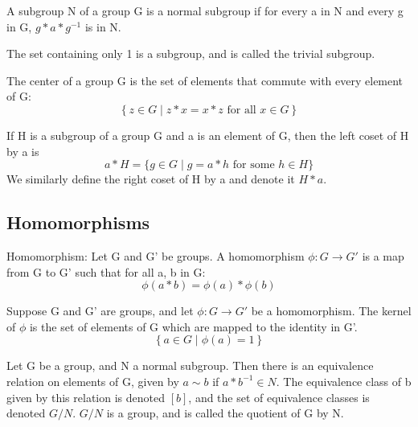 \documentclass[runningheads,a4paper]{llncs}
\renewcommand{\-}{\setminus}
\begin{document}
\begin{definition}[Normal]
A subgroup N of a group G is a normal subgroup if for every a in N and every g in G, $g * a * g^{-1}$ is in N.
\end{definition}

\begin{definition} The set containing only 1 is a subgroup, and is called the trivial subgroup.
\end{definition}

\begin{definition}[Center]
The center of a group G is the set of elements that commute with every element of G:
\[
\left\{ z \in G \mid z*x = x*z \text{ for all } x \in G \right\}
\]
\end{definition}

\begin{definition}
If H is a subgroup of a group G and a is an element of G, then the left coset of H by a is 
\[
a * H = \{ g \in G \mid g = a * h \text{ for some } h \in H \}
\]
We similarly define the right coset of H by a and denote it $H * a$.
\end{definition}

\subsection{Homomorphisms}

\begin{definition}[Homomorphism]
Homomorphism: Let G and G' be groups. A homomorphism $\phi : G \to G'$ is a map from G to G' such that for all a, b in G:
\[
\phi (a * b) = \phi(a) * \phi(b)
\]
\end{definition}

\begin{definition}[Kernel]
Suppose G and G' are groups, and let $\phi : G \to G'$ be a homomorphism. The kernel of $\phi$ is the set of elements of G which are mapped to the identity in G'.
\[
\left\{ a \in G \mid \phi(a) = 1 \right\}
\]
\end{definition}

\begin{definition}
Let G be a group, and N a normal subgroup. Then there is an equivalence relation on elements of G, given by $a \sim b$ if $a * b^{-1} \in N$. The equivalence class of b given by this relation is denoted $[b]$, and the set of equivalence classes is denoted $G/N$. $G/N$ is a group, and is called the quotient of G by N.
\end{definition}
\end{document}
